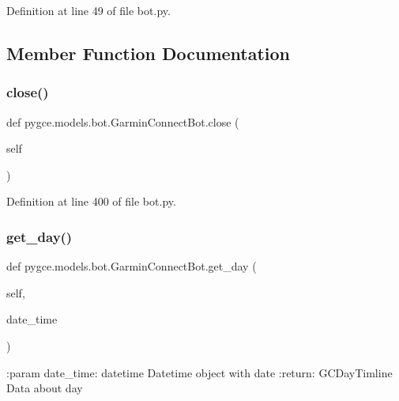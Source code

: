 Definition at line 49 of file bot.\+py.



\subsection{Member Function Documentation}
\mbox{\label{classpygce_1_1models_1_1bot_1_1_garmin_connect_bot_a969efb76eef02df4458492d68e92e231}} 
\subsubsection{\texorpdfstring{close()}{close()}}
{\footnotesize\ttfamily def pygce.\+models.\+bot.\+Garmin\+Connect\+Bot.\+close (\begin{DoxyParamCaption}\item[{}]{self }\end{DoxyParamCaption})}



Definition at line 400 of file bot.\+py.

\mbox{\label{classpygce_1_1models_1_1bot_1_1_garmin_connect_bot_ab5ab1e855230273b7c7c085a461a3ed2}} 
\subsubsection{\texorpdfstring{get\+\_\+day()}{get\_day()}}
{\footnotesize\ttfamily def pygce.\+models.\+bot.\+Garmin\+Connect\+Bot.\+get\+\_\+day (\begin{DoxyParamCaption}\item[{}]{self,  }\item[{}]{date\+\_\+time }\end{DoxyParamCaption})}

\begin{DoxyVerb}:param date_time: datetime
    Datetime object with date
:return: GCDayTimline
    Data about day
\end{DoxyVerb}
 

